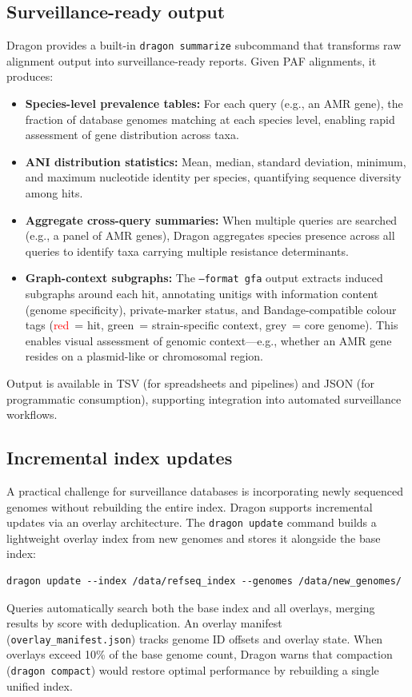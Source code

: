 \documentclass[11pt]{article}
\begin{document}
\subsection{Surveillance-ready output}

Dragon provides a built-in \texttt{dragon summarize} subcommand that transforms raw alignment output into surveillance-ready reports. Given PAF alignments, it produces:
\begin{itemize}
    \item \textbf{Species-level prevalence tables:} For each query (e.g., an AMR gene), the fraction of database genomes matching at each species level, enabling rapid assessment of gene distribution across taxa.
    \item \textbf{ANI distribution statistics:} Mean, median, standard deviation, minimum, and maximum nucleotide identity per species, quantifying sequence diversity among hits.
    \item \textbf{Aggregate cross-query summaries:} When multiple queries are searched (e.g., a panel of AMR genes), Dragon aggregates species presence across all queries to identify taxa carrying multiple resistance determinants.
    \item \textbf{Graph-context subgraphs:} The \texttt{--format gfa} output extracts induced subgraphs around each hit, annotating unitigs with information content (genome specificity), private-marker status, and Bandage-compatible colour tags (\textcolor{red}{red}~= hit, \textcolor{green!60!black}{green}~= strain-specific context, grey~= core genome). This enables visual assessment of genomic context---e.g., whether an AMR gene resides on a plasmid-like or chromosomal region.
\end{itemize}
Output is available in TSV (for spreadsheets and pipelines) and JSON (for programmatic consumption), supporting integration into automated surveillance workflows.

\subsection{Incremental index updates}

A practical challenge for surveillance databases is incorporating newly sequenced genomes without rebuilding the entire index. Dragon supports incremental updates via an overlay architecture. The \texttt{dragon update} command builds a lightweight overlay index from new genomes and stores it alongside the base index:
\begin{verbatim}
dragon update --index /data/refseq_index --genomes /data/new_genomes/
\end{verbatim}
Queries automatically search both the base index and all overlays, merging results by score with deduplication. An overlay manifest (\texttt{overlay\_manifest.json}) tracks genome ID offsets and overlay state. When overlays exceed 10\% of the base genome count, Dragon warns that compaction (\texttt{dragon compact}) would restore optimal performance by rebuilding a single unified index.
\end{document}
